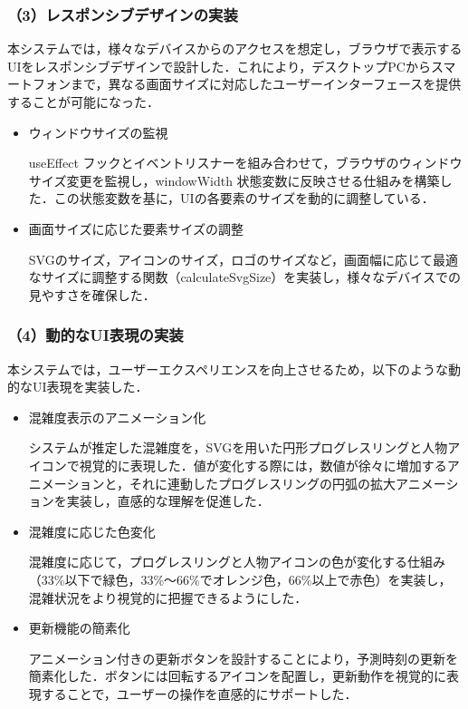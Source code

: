\subsubsection*{（3）レスポンシブデザインの実装}
本システムでは，様々なデバイスからのアクセスを想定し，ブラウザで表示するUIをレスポンシブデザインで設計した．これにより，デスクトップPCからスマートフォンまで，異なる画面サイズに対応したユーザーインターフェースを提供することが可能になった．

\begin{itemize}
	\item ウィンドウサイズの監視
	
	useEffect フックとイベントリスナーを組み合わせて，ブラウザのウィンドウサイズ変更を監視し，windowWidth 状態変数に反映させる仕組みを構築した．この状態変数を基に，UIの各要素のサイズを動的に調整している．
	
	\item 画面サイズに応じた要素サイズの調整
	
	SVGのサイズ，アイコンのサイズ，ロゴのサイズなど，画面幅に応じて最適なサイズに調整する関数（calculateSvgSize）を実装し，様々なデバイスでの見やすさを確保した．
\end{itemize}

\subsubsection*{（4）動的なUI表現の実装}
本システムでは，ユーザーエクスペリエンスを向上させるため，以下のような動的なUI表現を実装した．

\begin{itemize}
	\item 混雑度表示のアニメーション化
	
	システムが推定した混雑度を，SVGを用いた円形プログレスリングと人物アイコンで視覚的に表現した．値が変化する際には，数値が徐々に増加するアニメーションと，それに連動したプログレスリングの円弧の拡大アニメーションを実装し，直感的な理解を促進した．
	
	\item 混雑度に応じた色変化
	
	混雑度に応じて，プログレスリングと人物アイコンの色が変化する仕組み（33\%以下で緑色，33\%～66\%でオレンジ色，66\%以上で赤色）を実装し，混雑状況をより視覚的に把握できるようにした．
	
	\item 更新機能の簡素化
	
	アニメーション付きの更新ボタンを設計することにより，予測時刻の更新を簡素化した．ボタンには回転するアイコンを配置し，更新動作を視覚的に表現することで，ユーザーの操作を直感的にサポートした．
\end{itemize}

